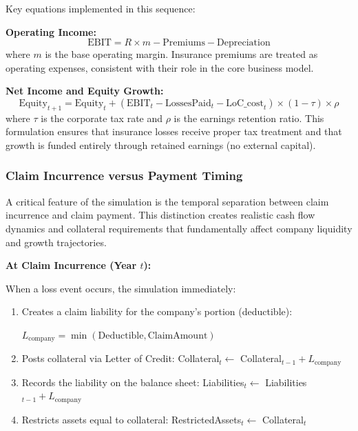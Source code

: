 \documentclass[11pt,letterpaper]{article}
\begin{document}
\vspace{\baselineskip}

Key equations implemented in this sequence:

\vspace{\baselineskip}

\textbf{Operating Income:}
\begin{equation}
\text{EBIT} = R \times m - \text{Premiums} - \text{Depreciation}
\end{equation}
where $m$ is the base operating margin. Insurance premiums are treated as operating expenses, consistent with their role in the core business model.

\vspace{\baselineskip}

\textbf{Net Income and Equity Growth:}
\begin{equation}
\text{Equity}_{t+1} = \text{Equity}_t + (\text{EBIT}_t - \text{LossesPaid}_t - \text{LoC\_cost}_t) \times (1-\tau) \times \rho
\end{equation}
where $\tau$ is the corporate tax rate and $\rho$ is the earnings retention ratio. This formulation ensures that insurance losses receive proper tax treatment and that growth is funded entirely through retained earnings (no external capital).

\subsubsection{Claim Incurrence versus Payment Timing}

A critical feature of the simulation is the temporal separation between claim incurrence and claim payment. This distinction creates realistic cash flow dynamics and collateral requirements that fundamentally affect company liquidity and growth trajectories.

\vspace{\baselineskip}

\textbf{At Claim Incurrence (Year $t$):}

When a loss event occurs, the simulation immediately:
\begin{enumerate}
    \item Creates a claim liability for the company's portion (deductible):

        $L_{\text{company}} = \min(\text{Deductible}, \text{ClaimAmount})$

    \item Posts collateral via Letter of Credit: Collateral$_t \gets$ Collateral$_{t-1} + L_{\text{company}}$
    \item Records the liability on the balance sheet: Liabilities$_t \gets$ Liabilities$_{t-1} + L_{\text{company}}$
    \item Restricts assets equal to collateral: RestrictedAssets$_t \gets$ Collateral$_t$
\end{enumerate}
\end{document}
